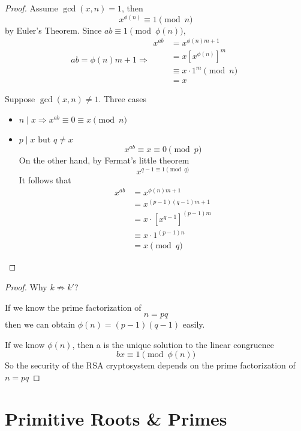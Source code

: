 \begin{proof}
    Assume $\gcd(x, n) = 1$, then
    \[
        x^{\phi(n)} \equiv 1 \pmod n
    \]
    by Euler's Theorem.
    Since $ab \equiv 1 \pmod {\phi(n)}$,
    \[
        ab = \phi(n)m+1 \Rightarrow
        \begin{aligned}
            x^{ab} &= x^{\phi(n)m + 1}\\
            &= x {[x^{\phi(n)}]}^m\\
            &\equiv x \cdot 1^m \pmod n\\
            &=x
        \end{aligned}
    \]

    Suppose $\gcd(x, n) \neq 1$. Three cases
    \begin{itemize}
        \item $n\; |\; x \Rightarrow x^{ab} \equiv 0 \equiv x \pmod n$
        \item $p\; |\; x \text{ but } q \neq x$
        \[
            x^{ab} \equiv x \equiv 0 \pmod p
        \]
        On the other hand, by Fermat's little theorem
        \[
            x^{q-1 \equiv 1 \pmod q}
        \]
        It follows that
        \[
            \begin{aligned}
                x^{ab} &= x^{\phi(n)m+1}\\
                &= x^{(p-1)(q-1)m+1}\\
                &= x\cdot{[x^{q-1}]}^{(p-1)m}\\
                &\equiv x\cdot 1^{(p-1)n}\\
                &= x \pmod q
            \end{aligned}
        \]
    \end{itemize}
    
\end{proof}

\begin{proof}
    Why $k \not\Rightarrow k\prime$?

    If we know the prime factorization of 
    \[  
        n = pq
    \]
    then we can obtain $\phi(n) = (p-1)(q-1)$ easily.

    If we know $\phi(n)$, then a is the unique solution to the linear congruence
    \[
        bx \equiv 1 \pmod{\phi(n)}
    \]
    So the security of the RSA cryptosystem depends on the prime factorization of 
    $n = pq$
\end{proof}

\section{Primitive Roots \& Primes}

